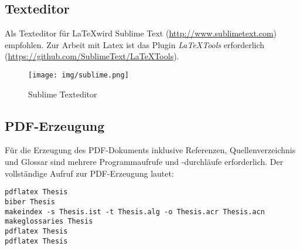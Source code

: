 \subsection{Texteditor}

Als Texteditor für \LaTeX wird Sublime Text (\url{http://www.sublimetext.com}) empfohlen. Zur Arbeit mit Latex ist das Plugin \emph{LaTeXTools} erforderlich (\url{https://github.com/SublimeText/LaTeXTools}).

\begin{figure}[hbt]
\centering
\begin{minipage}[t]{1\textwidth} %
\caption{Sublime Texteditor} %
\texttt{[image: img/sublime.png]}\\ %
\end{minipage}
\end{figure}

\subsection{PDF-Erzeugung}

Für die Erzeugung des PDF-Dokuments inklusive Referenzen, Quellenverzeichnis und Glossar sind mehrere Programmaufrufe und -durchläufe erforderlich. Der vollständige Aufruf zur PDF-Erzeugung lautet: 

\texttt{pdflatex Thesis}\\
\texttt{biber Thesis}\\
\texttt{makeindex -s Thesis.ist -t Thesis.alg -o Thesis.acr Thesis.acn}\\
\texttt{makeglossaries Thesis}\\
\texttt{pdflatex Thesis}\\
\texttt{pdflatex Thesis}\\